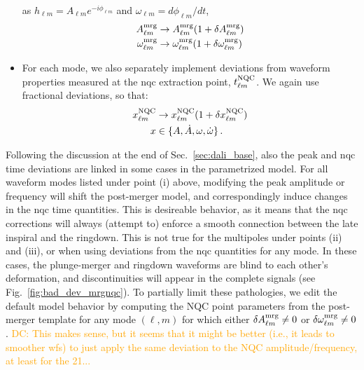\documentclass[prd,amssymb,amsmath,amsfonts,nofootinbib,reprint,showpacs,longbibliography]{revtex4-1}
\newcommand{\DC}[1]{{\textcolor{orange}{{DC: #1}} }}
\newcommand{\amrg}[1]{{A_{#1}^{\rm mrg}}}
\newcommand{\omgmrg}[1]{{\omega_{#1}^{\rm mrg}}}
\begin{document}
\begin{itemize}
    as $h_{\ell m} = A_{\ell m} e^{-i \phi_{\ell m}}$ and $\omega_{\ell m} = d\phi_{\ell m}/dt$,
    \begin{subequations}
    \begin{align}
    A_{\ell m}^{\rm mrg} &\rightarrow A_{\ell m}^{\rm mrg} (1 + \delta A_{\ell m}^{\rm mrg}) \\
    \omega_{\ell m}^{\rm mrg} &\rightarrow \omega_{\ell m}^{\rm mrg} (1 + \delta \omega_{\ell m}^{\rm mrg})
    \end{align}
    \end{subequations}
    \item For each mode, we also separately implement deviations from waveform properties measured at the \ac{nqc}
    extraction point, $t_{\ell m}^{\rm NQC}$. We again use fractional deviations, so that:
    \begin{subequations}
    \begin{align}
    x_{\ell m}^{\rm NQC} &\rightarrow x_{\ell m}^{\rm NQC} (1 + \delta x_{\ell m}^{\rm NQC}) \\
    x &\in \{A, \dot{A}, \omega, \dot{\omega}\} \, .
    \end{align}
    \end{subequations}
\end{itemize}

Following the discussion at the end of Sec.~\ref{sec:dali_base}, also the peak and \ac{nqc} time deviations
are linked in some cases in the parametrized model. For all waveform modes listed under point (i) above,
modifying the peak amplitude or frequency will shift the post-merger model, and correspondingly induce
changes in the \ac{nqc} time quantities. This is desireable behavior, as it means that the \ac{nqc}
corrections will always (attempt to) enforce a smooth connection between the late inspiral and the ringdown.
This is not true for the multipoles under points (ii) and (iii), or when using deviations from the
\ac{nqc} quantities for any mode. In these cases, the plunge-merger and ringdown waveforms are blind to each
other's deformation, and discontinuities will appear in the complete signals (see Fig.~\ref{fig:bad_dev_mrgnqc}).
To partially limit these pathologies, we edit the default model behavior by computing the NQC point
parameters from the post-merger template for any mode $(\ell, m)$ for which either
$\delta \amrg{\ell m} \neq 0$ or $\delta \omgmrg{\ell m} \neq 0$.
\DC{This makes sense, but it seems that it might be better (i.e., it leads to smoother wfs) to just
apply the same deviation to the NQC amplitude/frequency, at least for the 21...}
\end{document}
